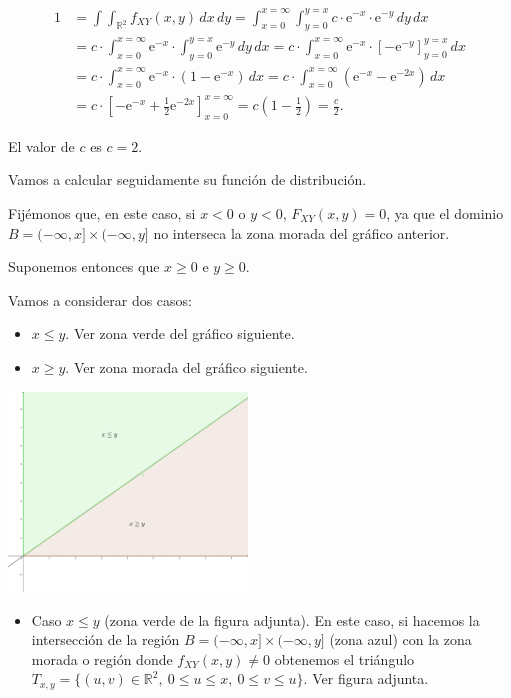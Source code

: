 \documentclass[
  letterpaper,
  DIV=11,
  numbers=noendperiod]{scrreprt}
\providecommand{\tightlist}{%
  \setlength{\itemsep}{0pt}\setlength{\parskip}{0pt}}\usepackage{longtable,booktabs,array}
\begin{document}
\[
\begin{array}{rl}
1 &=  \int\int_{\mathbb{R}^2}f_{XY}(x,y)\, dx\, dy=\int_{x=0}^{x=\infty}\int_{y=0}^{y=x} c \cdot\mathrm{e}^{-x}\cdot\mathrm{e}^{-y} \, dy\, dx \\
  &=  c\cdot \int_{x=0}^{x=\infty}\mathrm{e}^{-x}\cdot\int_{y=0}^{y=x}\mathrm{e}^{-y}\, dy\, dx = c \cdot  \int_{x=0}^{x=\infty}\mathrm{e}^{-x}\cdot\left[-\mathrm{e}^{-y}\right]_{y=0}^{y=x}\, dx \\
  &=  c \cdot\int_{x=0}^{x=\infty}\mathrm{e}^{-x}\cdot\left(1-\mathrm{e}^{-x}\right)\, dx =c \cdot\int_{x=0}^{x=\infty}\left(\mathrm{e}^{-x}-\mathrm{e}^{-2x}\right)\, dx 
  \\ & =  c \cdot\left[-\mathrm{e}^{-x}+\frac{1}{2}\mathrm{e}^{-2x}\right]_{x=0}^{x=\infty} = c\left(1-\frac{1}{2}\right)=\frac{c}{2}.
\end{array}
\]

El valor de \(c\) es \(c=2\).

Vamos a calcular seguidamente su función de distribución.

Fijémonos que, en este caso, si \(x<0\) o \(y<0\), \(F_{XY}(x,y)=0\), ya
que el dominio \(B=(-\infty,x]\times (-\infty,y]\) no interseca la zona
morada del gráfico anterior.

Suponemos entonces que \(x\geq 0\) e \(y\geq 0\).

Vamos a considerar dos casos:

\begin{itemize}
\item
  \(x\leq y\). Ver zona verde del gráfico siguiente.
\item
  \(x\geq y\). Ver zona morada del gráfico siguiente.
\end{itemize}

\includegraphics[width=2.5in,height=\textheight]{Images/Ejemplo2Bidi2.png}

\begin{itemize}
\tightlist
\item
  Caso \(x\leq y\) (zona verde de la figura adjunta). En este caso, si
  hacemos la intersección de la región
  \(B=(-\infty,x]\times (-\infty,y]\) (zona azul) con la zona morada o
  región donde \(f_{XY}(x,y)\neq 0\) obtenemos el triángulo
  \(T_{x,y}=\{(u,v)\in\mathbb{R}^2,\ 0\leq u\leq x,\ 0\leq v\leq u\}.\)
  Ver figura adjunta.
\end{itemize}
\end{document}
